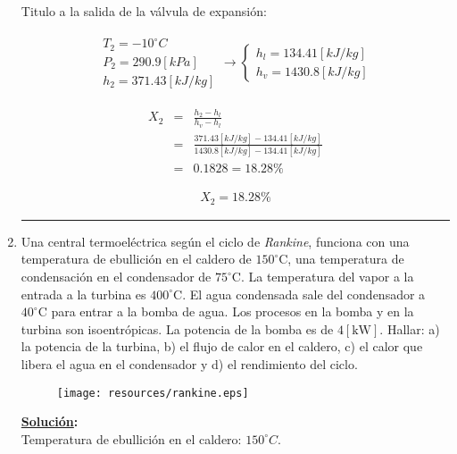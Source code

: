 \documentclass[letter,10pt]{article}
\begin{document}
\begin{enumerate}
Titulo a la salida de la válvula de expansión:

\begin{eqnarray*}
    \begin{array}{c}
        T_2 = -10^\circ C \\
        P_2 = 290.9[kPa] \\
        h_2 = 371.43[kJ/kg]
    \end{array}
    \rightarrow
    \begin{cases}
        h_l = 134.41[kJ/kg] \\
        h_v = 1430.8[kJ/kg]
    \end{cases}
\end{eqnarray*}

\begin{eqnarray*}
    X_2 &=& \frac{h_2 - h_l}{h_v - h_l} \\
        &=& \frac{371.43[kJ/kg]-134.41[kJ/kg]}{1430.8[kJ/kg]-134.41[kJ/kg]} \\
        &=& 0.1828 = 18.28\%
\end{eqnarray*}

\begin{equation*}
\boxed{
    \begin{array}{l}
        X_2 = 18.28\%
    \end{array}
}
\end{equation*}

\noindent\rule{15.2cm}{0.4pt}

\item Una central termoeléctrica según el ciclo de \emph{Rankine}, funciona con
una temperatura de ebullición en el caldero de $150^\circ\text{C}$, una
temperatura de condensación en el condensador de $75^\circ\text{C}$. La
temperatura del vapor a la entrada a la turbina es $400^\circ\text{C}$. El agua
condensada sale del condensador a $40^\circ\text{C}$ para entrar a la bomba de
agua. Los procesos en la bomba y en la turbina son isoentrópicas. La potencia de
la bomba es de $4[\text{kW}]$. Hallar: a) la potencia de la turbina, b) el flujo
de calor en el caldero, c) el calor que libera el agua en el condensador y d) el
rendimiento del ciclo.

\begin{figure}[H]
\centering
\texttt{[image: resources/rankine.eps]}
\end{figure}

\textbf{\underline{Solución}:} \\

Temperatura de ebullición en el caldero: $150^\circ C$.


\end{enumerate}
\end{document}
